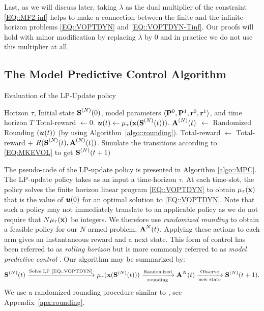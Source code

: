 Last, as we will discuss later, taking $\lambda$ as the dual multiplier of the constraint \eqref{EQ::MF2-inf} helps to make a connection between the finite and the infinite-horizon problems \eqref{EQ::VOPTDYN} and \eqref{EQ::VOPTDYN-Tinf}. Our proofs will hold with minor modification by replacing $\lambda$ by $0$ and in practice we do not use this multiplier at all.

\subsection{The Model Predictive Control Algorithm}
\begin{algorithm}[ht]
	\caption{Evaluation of the LP-Update policy}
	\label{algo::MPC}
	\begin{algorithmic}
            \REQUIRE Horizon $\tau$, Initial state $\textbf{S}^{(N)}(0)$, model parameters $\langle \mathbf{P}^{0}, \mathbf{P}^{1}, \mathbf{r}^{0}, \mathbf{r}^{1} \rangle$, and time horizon $T$
            \STATE Total-reward $\leftarrow 0$.
            \STATE $\bm{u}(t) \leftarrow \mu_{\tau}(\textbf{x}(\textbf{S}^{(N)}(t)))$.
            \STATE $\textbf{A}^{(N)}(t)$ $\leftarrow$ Randomized Rounding $(\bm{u}(t))$ %
            (by using Algorithm~\ref{algo::rounding}).
            \STATE Total-reward $\leftarrow$ Total-reward + $R(\textbf{S}^{(N)}(t), \textbf{A}^{(N)}(t))$.
            \STATE Simulate the transitions according to \eqref{EQ:MKEVOL} to get $\textbf{S}^{(N)}(t + 1)$            \ENDFOR
	\end{algorithmic}
\end{algorithm}

The pseudo-code of the LP-update policy is presented in Algorithm \ref{algo::MPC}. The LP-update policy takes as an input a time-horizon $\tau$. At each time-slot, the policy solves the finite horizon linear program \eqref{EQ::VOPTDYN} to obtain $\mu_{\tau}(\textbf{x})$ that is the value of $\bm{u}(0)$ for an optimal solution to \eqref{EQ::VOPTDYN}. Note that such a policy may not immediately translate to an applicable policy as we do not require that $N\mu_{\tau}(\textbf{x})$ be integers. We therefore use \emph{randomized rounding} to obtain a feasible policy for our $N$ armed problem, $\textbf{A}^{N}(t)$. Applying these actions to each arm gives an instantaneous reward and a next state. This form of control has been referred to as \emph{rolling horizon} \citet{puterman2014markov} but is more commonly referred to as \emph{model predictive control} \citet{DTGLS14}. Our algorithm may be summarized by:
\begin{equation}\label{EQ::ALGO}
    \textbf{S}^{(N)}(t) \xrightarrow[]{\text{Solve LP \eqref{EQ::VOPTDYN}}}\mu_{\tau}(\textbf{x}(\textbf{S}^{(N)}(t))) \xrightarrow[\text{rounding}]{\text{Randomized}} \textbf{A}^{N}(t) \xrightarrow[\text{new state}]{\text{Observe}} \textbf{S}^{(N)}(t + 1). 
\end{equation}
We use a randomized rounding procedure similar to \cite{GGY23}, %
see Appendix~\ref{apx:rounding}. 

